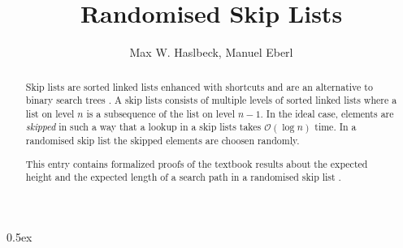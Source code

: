 \documentclass[11pt,a4paper]{article}
\begin{document}
\title{Randomised Skip Lists}
\author{Max W. Haslbeck, Manuel Eberl}
\maketitle

\begin{abstract}
Skip lists are sorted linked lists enhanced with shortcuts and are an alternative to binary search trees \cite{pugh1989skip}.
A skip lists consists of multiple levels of sorted linked lists where a list on level $n$ is a subsequence of the list on level $n - 1$.
In the ideal case, elements are \emph{skipped} in such a way that a lookup in a skip lists takes $\mathcal{O}(\log{n})$ time.
In a randomised skip list the skipped elements are choosen randomly.

This entry contains formalized proofs of the textbook results about the expected height and the expected length of a search path in a randomised skip list \cite{motwani1995}.
\end{abstract}

\tableofcontents
\newpage
\parindent 0pt\parskip 0.5ex





\end{document}
